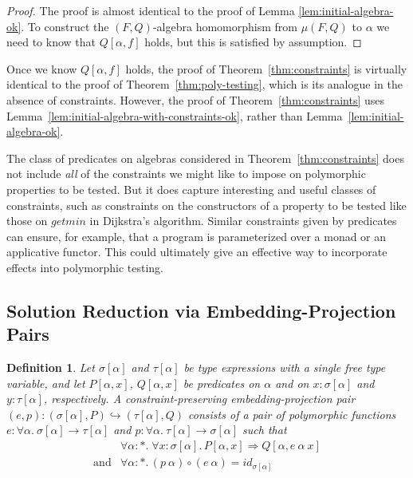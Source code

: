 \documentclass{article}[12 pt]
\newtheorem{definition}{Definition}
\theoremstyle{problemstyle}
\begin{document}
\begin{proof}
  The proof is almost identical to the proof of Lemma
  \ref{lem:initial-algebra-ok}. To construct the $(F,Q)$-algebra
  homomorphism from $\mu (F,Q)$ to $\alpha$ we need to know that
  $Q[\alpha,f]$ holds, but this is satisfied by assumption.
\end{proof}

Once we know $Q[\alpha,f]$ holds, the proof of
Theorem~\ref{thm:constraints} is virtually identical to the proof of
Theorem~\ref{thm:poly-testing}, which is its analogue in the absence
of constraints. However, the proof of Theorem~\ref{thm:constraints}
uses Lemma~\ref{lem:initial-algebra-with-constraints-ok}, rather than
Lemma~\ref{lem:initial-algebra-ok}.

The class of predicates on algebras considered in
Theorem~\ref{thm:constraints} does not include {\em all} of the
constraints we might like to impose on polymorphic properties to be
tested. But it does capture interesting and useful classes of
constraints, such as constraints on the constructors of a property to
be tested like those on $\mathit{getmin}$ in Dijkstra's
algorithm. Similar constraints given by predicates can ensure, for
example, that a program is parameterized over a monad or an
applicative functor. This could ultimately give an effective way to
incorporate effects into polymorphic testing.

\subsection{Solution Reduction via Embedding-Projection Pairs}

\begin{definition}\label{def:ep-with-constraints}
  Let $\sigma[\alpha]$ and $\tau[\alpha]$ be type expressions with a
  single free type variable, and let $P[\alpha,x]$, $Q[\alpha,x]$ be
  predicates on $\alpha$ and on $x : \sigma[\alpha]$ and $y :
  \tau[\alpha]$, respectively. A \emph{constraint-preserving
    embedding-projection pair} $(e,p) : (\sigma[\alpha], P)
  \hookrightarrow (\tau[\alpha], Q)$ consists of a pair of polymorphic
  functions $e : \forall \alpha.~\sigma[\alpha] \to \tau[\alpha]$ and
  $p : \forall \alpha.~\tau[\alpha] \to \sigma[\alpha]$ such that
  \begin{displaymath}
    \begin{array}{ll}
     & \forall \alpha : *.\; \forall x : \sigma[\alpha]. \, P[\alpha,x]
      \Rightarrow Q[\alpha,e~\alpha~x]\\ \mbox{and} & \forall \alpha
      : *. \, (p~\alpha) \circ (e~\alpha) = \mathit{id}_{\sigma[\alpha]}
    \end{array}
  \end{displaymath}
\end{definition}
\end{document}
